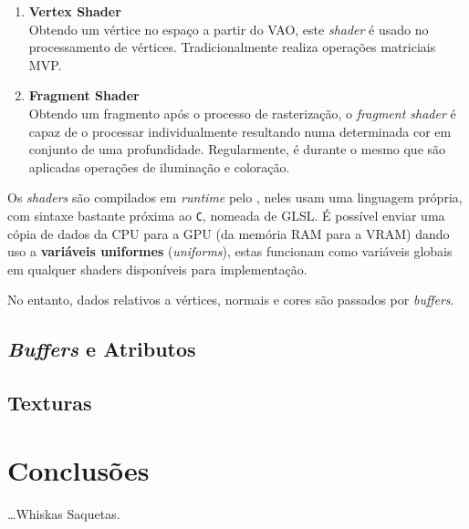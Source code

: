\begin{enumerate}
    \item \textbf{Vertex Shader}\\
    Obtendo um vértice no espaço a partir do \ac{VAO}, este \textit{shader} é usado no processamento de vértices. Tradicionalmente realiza operações matriciais \ac{MVP}.
    
    \item \textbf{Fragment Shader}\\
    Obtendo um fragmento após o processo de rasterização, o \textit{fragment shader} é capaz de o processar individualmente resultando numa determinada cor em conjunto de uma profundidade. Regularmente, é durante o mesmo que são aplicadas operações de iluminação e coloração.
\end{enumerate}

Os \textit{shaders} são compilados em \textit{runtime} pelo \opengl, neles usam uma linguagem própria, com sintaxe bastante próxima ao \verb*|C|, nomeada de \ac{GLSL}.
É possível enviar uma cópia de dados da \ac{CPU} para a \ac{GPU} (da memória \ac{RAM} para a \ac{VRAM}) dando uso a \textbf{variáveis uniformes} (\textit{uniforms}), estas funcionam como variáveis globais em qualquer shaders disponíveis para implementação.

No entanto, dados relativos a vértices, normais e cores são passados por \textit{buffers}.

\subsection{\emph{Buffers} e Atributos}


\subsection{Texturas}


\section{Conclusões}
\label{sec::arte:conc}

\ldots Whiskas Saquetas.

